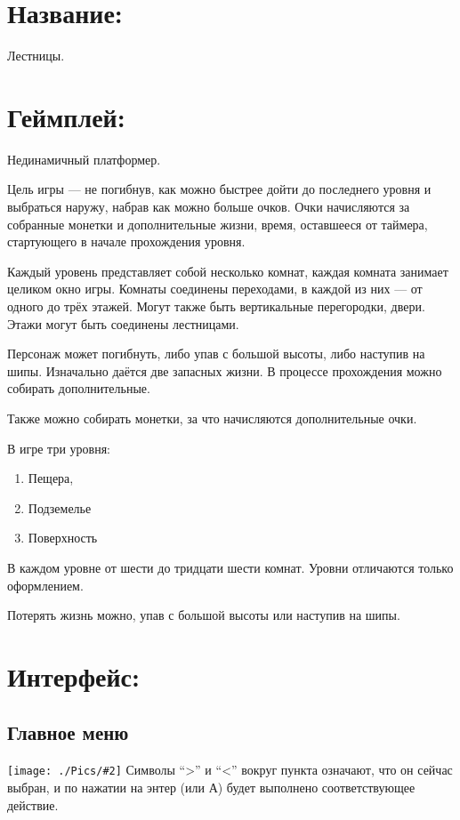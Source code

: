 \documentclass[12pt,a4paper,fullpage]{article}
\begin{document}
\newcommand{\pic}[2] {
  \texttt{[image: ./Pics/\#2]}}

\section{Название:} Лестницы.
\section{Геймплей:} Нединамичный платформер.

Цель игры --- не погибнув, как можно быстрее дойти до последнего уровня и выбраться наружу, набрав как можно больше очков. Очки начисляются за собранные монетки и дополнительные жизни, время, оставшееся от таймера, стартующего в начале прохождения уровня.

Каждый уровень представляет собой несколько комнат, каждая комната занимает целиком окно игры. Комнаты соединены переходами, в каждой из них --- от одного до трёх этажей. Могут также быть вертикальные перегородки, двери. Этажи могут быть соединены лестницами.

Персонаж может погибнуть, либо упав с большой высоты, либо наступив на шипы. Изначально даётся две запасных жизни. В процессе прохождения можно собирать дополнительные.

Также можно собирать монетки, за что начисляются дополнительные очки.

В игре три уровня:
\begin{enumerate}
\item Пещера,
\item Подземелье
\item Поверхность
\end{enumerate}
В каждом уровне от шести до тридцати шести комнат. Уровни отличаются только оформлением.

Потерять жизнь можно, упав с большой высоты или наступив на шипы.

\section{Интерфейс:}
\subsection{Главное меню}

\noindent \pic{0.27}{mainmenu}
Символы ``>'' и ``<'' вокруг пункта означают, что он сейчас выбран, и по нажатии на энтер (или А) будет выполнено соответствующее действие.
\end{document}
